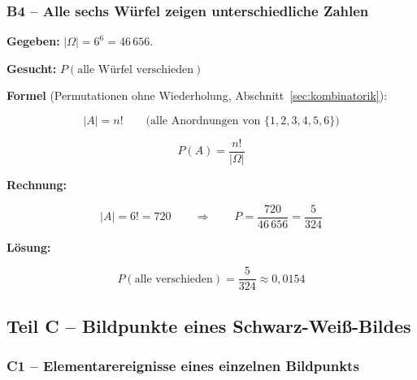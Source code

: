 \subsubsection*{B4 – Alle sechs Würfel zeigen unterschiedliche Zahlen}

\begin{beispiel}

\textbf{Gegeben:} $|\Omega| = 6^6 = 46\,656$.

\textbf{Gesucht:} $P(\text{alle Würfel verschieden})$

\textbf{Formel} (Permutationen ohne Wiederholung, Abschnitt~\ref{sec:kombinatorik}):

$$
|A| = n! \qquad \text{(alle Anordnungen von } \{1,2,3,4,5,6\}\text{)}
$$

$$
P(A) = \frac{n!}{|\Omega|}
$$

\textbf{Rechnung:}

$$
|A| = 6! = 720
\qquad\Rightarrow\qquad
P = \frac{720}{46\,656} = \frac{5}{324}
$$

\textbf{Lösung:}

$$
\boxed{P(\text{alle verschieden}) = \frac{5}{324} \approx 0{,}0154}
$$

\end{beispiel}

\subsection*{Teil C – Bildpunkte eines Schwarz-Weiß-Bildes}

\subsubsection*{C1 – Elementarereignisse eines einzelnen Bildpunkts}

